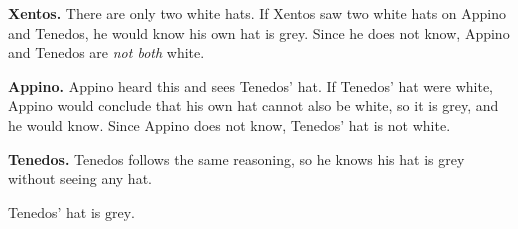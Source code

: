 \textbf{Xentos.} There are only two white hats. If Xentos saw two white hats on Appino and Tenedos, he would know his own hat is grey. Since he does not know, Appino and Tenedos are \emph{not both} white.

\textbf{Appino.} Appino heard this and sees Tenedos' hat. If Tenedos' hat were white, Appino would conclude that his own hat cannot also be white, so it is grey, and he would know. Since Appino does not know, Tenedos' hat is not white.

\textbf{Tenedos.} Tenedos follows the same reasoning, so he knows his hat is grey without seeing any hat.

Tenedos' hat is $\boxed{\text{grey}}$.
